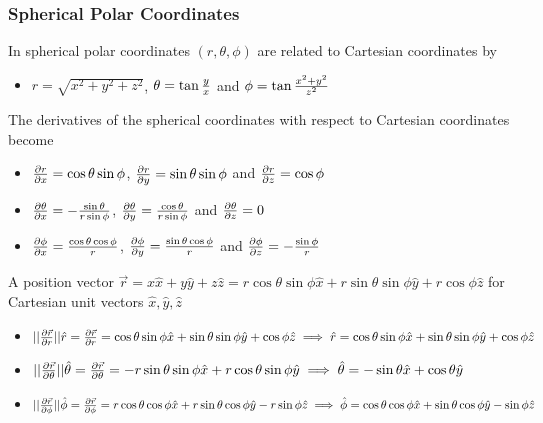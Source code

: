 \documentclass[8pt,t,mathserif,aspectratio=169]{beamer}
\begin{document}
\begin{frame}
  \frametitle{Spherical Polar Coordinates}
  \vspace{1mm}
  In spherical polar coordinates $(r,\theta,\phi)$ are related to Cartesian coordinates by
  \begin{itemize}
    \item $r = \sqrt{x^2 + y^2 + z^2}$, $\theta = \tan{y \over x}$ and $\phi = \tan{x^2 + y^2 \over z^2}$
  \end{itemize}
  The derivatives of the spherical coordinates with respect to Cartesian coordinates become
  \begin{itemize}
    \item ${\partial r \over \partial x} = \cos{\theta} \sin{\phi}$, ${\partial r \over \partial y} = \sin{\theta} \sin{\phi}$ and ${\partial r \over \partial z} = \cos{\phi}$
    \item ${\partial \theta \over \partial x} = -{\sin{\theta} \over r \sin{\phi}}$, ${\partial \theta \over \partial y} = {\cos{\theta} \over r \sin{\phi}}$ and ${\partial \theta \over \partial z} = 0$
    \item ${\partial \phi \over \partial x} = {\cos{\theta} \cos{\phi} \over r}$, ${\partial \phi \over \partial y} = {\sin{\theta} \cos{\phi} \over r}$ and ${\partial \phi \over \partial z} = -{\sin{\phi} \over r}$
  \end{itemize}
  A position vector $\vec{r} = x \hat{x} + y \hat{y} + z \hat{z} = r \cos{\theta} \sin{\phi} \hat{x} + r \sin{\theta} \sin{\phi} \hat{y} + r \cos{\phi} \hat{z}$ for Cartesian unit vectors $\hat{x},\hat{y},\hat{z}$
  \begin{itemize}
    \item $||{\partial \vec{r} \over \partial r}|| \hat{r} = {\partial \vec{r} \over \partial r} = \cos{\theta} \sin{\phi} \hat{x} + \sin{\theta} \sin{\phi} \hat{y} + \cos{\phi} \hat{z} \implies \hat{r} = \cos{\theta} \sin{\phi} \hat{x} + \sin{\theta} \sin{\phi} \hat{y} + \cos{\phi} \hat{z}$
    \item $||{\partial \vec{r} \over \partial \theta}|| \hat{\theta} = {\partial \vec{r} \over \partial \theta} = -r \sin{\theta} \sin{\phi} \hat{x} + r \cos{\theta} \sin{\phi} \hat{y} \implies \hat{\theta} = -\sin{\theta} \hat{x} + \cos{\theta} \hat{y}$
    \item $||{\partial \vec{r} \over \partial \phi}|| \hat{\phi} = {\partial \vec{r} \over \partial \phi} = r \cos{\theta} \cos{\phi} \hat{x} + r \sin{\theta} \cos{\phi} \hat{y} - r \sin{\phi} \hat{z} \implies \hat{\phi} = \cos{\theta} \cos{\phi} \hat{x} + \sin{\theta} \cos{\phi} \hat{y} - \sin{\phi} \hat{z}$

\end{itemize}
\end{frame}
\end{document}
